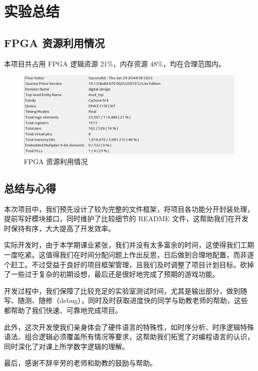 \section{实验总结}
\subsection{FPGA 资源利用情况}

本项目共占用 FPGA 逻辑资源 21\%，内存资源 48\%，均在合理范围内。

\begin{figure}[H]
    \centering
    \includegraphics[scale=0.82]{images/compile_result.png}
    \caption{FPGA 资源利用情况}
    \label{fig:compile_result}
\end{figure}



\subsection{总结与心得}
本次项目中，我们预先设计了较为完整的文件框架，将项目各功能分开封装处理，提前写好模块接口，同时维护了比较细节的 README 文件，这帮助我们在开发时保持有序，大大提高了开发效率。

实际开发时，由于本学期课业紧张，我们并没有太多富余的时间，这使得我们工期一度吃紧。这值得我们在时间分配问题上作出反思，日后做到合理地配置，而非逐个赶工。不过受益于良好的项目框架管理，且我们及时调整了项目计划目标，砍掉了一些过于复杂的初期设想，最后还是很好地完成了预期的游戏功能。

开发过程中，我们保障了比较充足的实验室测试时间，尤其是输出部分，做到随写、随测、随修（debug），同时及时获取进度快的同学与助教老师的帮助，这些都帮助了我们快速、可靠地完成项目。

此外，这次开发使我们亲身体会了硬件语言的特殊性，如时序分析、时序逻辑特殊语法、组合逻辑必须覆盖所有情况等要求，这帮助我们拓宽了对编程语言的认识，同时深化了对课上所学数字逻辑的理解。

最后，感谢不辞辛劳的老师和助教的鼓励与帮助。